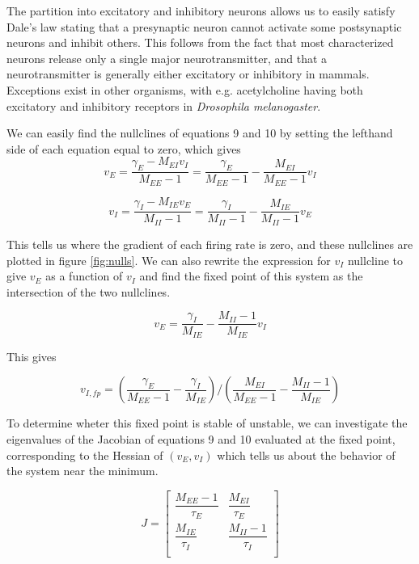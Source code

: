 \documentclass{article}
\begin{document}
The partition into excitatory and inhibitory neurons allows us to easily satisfy Dale's law stating that a presynaptic neuron cannot activate some postsynaptic neurons and inhibit others. This follows from the fact that most characterized neurons release only a single major neurotransmitter, and that a neurotransmitter is generally either excitatory or inhibitory in mammals. Exceptions exist in other organisms, with e.g. acetylcholine having both excitatory and inhibitory receptors in \textit{Drosophila melanogaster}.

We can easily find the nullclines of equations 9 and 10 by setting the lefthand side of each equation equal to zero, which gives
\begin{equation}
v_E = \dfrac{\gamma_E-M_{EI} v_I}{M_{EE}-1} = \dfrac{\gamma_E}{M_{EE}-1}-\dfrac{M_{EI}}{M_{EE}-1} v_I
\end{equation}

\begin{equation}
v_I = \dfrac{ \gamma_I - M_{IE} v_E}{M_{II}-1} = \dfrac{\gamma_I}{M_{II}-1} - \dfrac{M_{IE}}{M_{II}-1} v_E 
\end{equation}

This tells us where the gradient of each firing rate is zero, and these nullclines are plotted in figure \ref{fig:nulls}.
We can also rewrite the expression for $v_I$ nullcline to give $v_E$ as a function of $v_I$ and find the fixed point of this system as the intersection of the two nullclines.

\begin{equation}
v_E = \dfrac{\gamma_I}{M_{IE}} - \dfrac{M_{II}-1}{M_{IE}} v_I 
\end{equation}

This gives

\begin{equation}
v_{I,fp} =    ( \dfrac{\gamma_E}{M_{EE}-1} - \dfrac{\gamma_I}{M_{IE}} ) / (\dfrac{M_{EI}}{M_{EE}-1} -  \dfrac{M_{II}-1}{M_{IE}})  
\end{equation}

To determine wheter this fixed point is stable of unstable, we can investigate the eigenvalues of the Jacobian of equations 9 and 10 evaluated at the fixed point, corresponding to the Hessian of $(v_E, v_I)$ which tells us about the behavior of the system near the minimum.

\[
J = 
\begin{bmatrix}
   \dfrac{M_{EE}-1}{\tau_E} &  \dfrac{M_{EI}}{\tau_E} \\
     \dfrac{M_{IE}}{\tau_I} & \dfrac{M_{II}-1}{\tau_I} \\
\end{bmatrix}
\]
\end{document}
